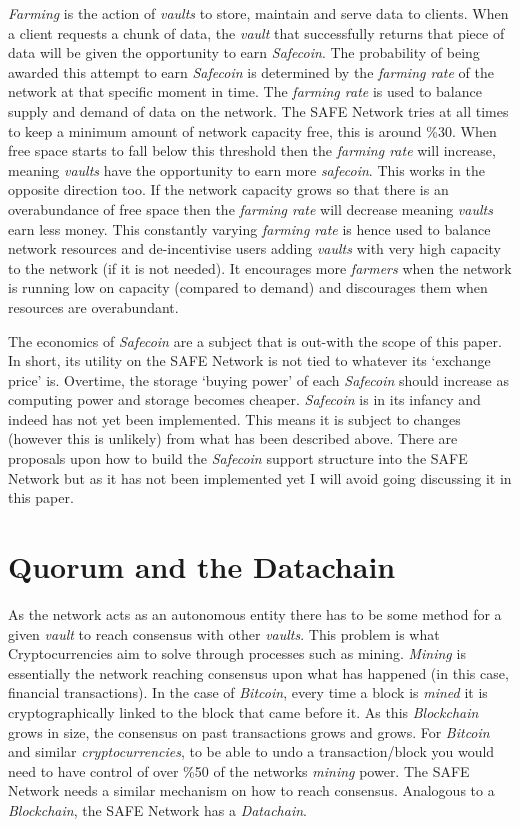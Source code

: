 \textit{Farming} is the action of \textit{vaults} to store, maintain and serve data to clients. When a client requests a chunk of data, the \textit{vault} that successfully returns that piece of data will be given the opportunity to earn \textit{Safecoin}. The probability of being awarded this attempt to earn \textit{Safecoin} is determined by the \textit{farming rate} of the network at that specific moment in time. The \textit{farming rate} is used to balance supply and demand of data on the network. The SAFE Network tries at all times to keep a minimum amount of network capacity free, this is around \%30. When free space starts to fall below this threshold then the \textit{farming rate} will increase, meaning \textit{vaults} have the opportunity to earn more \textit{safecoin}. This works in the opposite direction too. If the network capacity grows so that there is an overabundance of free space then the \textit{farming rate} will decrease meaning \textit{vaults} earn less money. This constantly varying \textit{farming rate} is hence used to balance network resources and de-incentivise users adding \textit{vaults} with very high capacity to the network (if it is not needed). It encourages more \textit{farmers} when the network is running low on capacity (compared to demand) and discourages them when resources are overabundant.

The economics of \textit{Safecoin} are a subject that is out-with the scope of this paper. In short, its utility on the SAFE Network is not tied to whatever its `exchange price' is. Overtime, the storage `buying power' of each \textit{Safecoin} should increase as computing power and storage becomes cheaper. \textit{Safecoin} is in its infancy and indeed has not yet been implemented. This means it is subject to changes (however this is unlikely) from what has been described above. There are proposals upon how to build the \textit{Safecoin} support structure into the SAFE Network but as it has not been implemented yet I will avoid going discussing it in this paper.

\section{Quorum and the Datachain}

As the network acts as an autonomous entity there has to be some method for a given \textit{vault} to reach consensus with other \textit{vaults}. This problem is what Cryptocurrencies aim to solve through processes such as mining. \textit{Mining} is essentially the network reaching consensus upon what has happened (in this case, financial transactions). In the case of \textit{Bitcoin}, every time a block is \textit{mined} it is cryptographically linked to the block that came before it. As this \textit{Blockchain} grows in size, the consensus on past transactions grows and grows. For \textit{Bitcoin} and similar \textit{cryptocurrencies}, to be able to undo a transaction/block you would need to have control of over \%50 of the networks \textit{mining} power. The SAFE Network needs a similar mechanism on how to reach consensus. Analogous to a \textit{Blockchain}, the SAFE Network has a \textit{Datachain}. 

